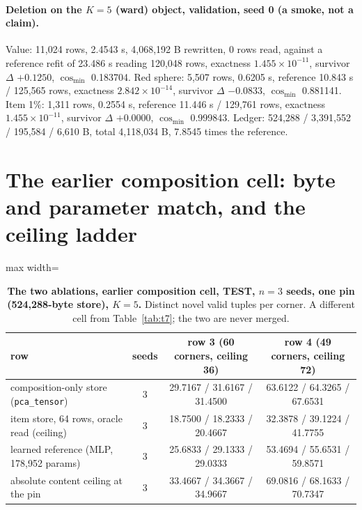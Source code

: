 \documentclass{article}
\newcommand{\sci}[2]{\ensuremath{#1\times10^{#2}}}
\begin{document}
\paragraph{Deletion on the $K=5$ (ward) object, validation, seed 0 (a smoke, not a claim).} Value:
11,024 rows, 2.4543 s, 4,068,192 B rewritten, 0 rows read, against a reference refit of 23.486 s
reading 120,048 rows, exactness \sci{1.455}{-11}, survivor $\Delta$ $+0.1250$, $\cos_{\min}$
0.183704. Red sphere: 5,507 rows, 0.6205 s, reference 10.843 s / 125,565 rows, exactness
\sci{2.842}{-14}, survivor $\Delta$ $-0.0833$, $\cos_{\min}$ 0.881141. Item 1\%: 1,311 rows,
0.2554 s, reference 11.446 s / 129,761 rows, exactness \sci{1.455}{-11}, survivor $\Delta$
$+0.0000$, $\cos_{\min}$ 0.999843. Ledger: 524,288 / 3,391,552 / 195,584 / 6,610 B, total
4,118,034 B, 7.8545 times the reference.

\section{The earlier composition cell: byte and parameter match, and the ceiling ladder}
\label{app:w5}

\begin{table}[h]
\centering\small
\caption{\textbf{The two ablations, earlier composition cell, TEST, $n=3$ seeds, one pin
(524,288-byte store), $K=5$.} Distinct novel valid tuples per corner. A different cell from
Table~\ref{tab:t7}; the two are never merged.}
\label{tab:ablations}
\setlength{\tabcolsep}{3pt}
\begin{adjustbox}{max width=\linewidth}\begin{tabular}{lccc}
\toprule
row & seeds & row 3 (60 corners, ceiling 36) & row 4 (49 corners, ceiling 72) \\
\midrule
composition-only store (\texttt{pca\_tensor}) & 3 & 29.7167 / 31.6167 / 31.4500 & 63.6122 / 64.3265 / 67.6531 \\
item store, 64 rows, oracle read (ceiling) & 3 & 18.7500 / 18.2333 / 20.4667 & 32.3878 / 39.1224 / 41.7755 \\
learned reference (MLP, 178,952 params) & 3 & 25.6833 / 29.1333 / 29.0333 & 53.4694 / 55.6531 / 59.8571 \\
absolute content ceiling at the pin & 3 & 33.4667 / 34.3667 / 34.9667 & 69.0816 / 68.1633 / 70.7347 \\
\bottomrule
\end{tabular}\end{adjustbox}
\end{table}
\end{document}
